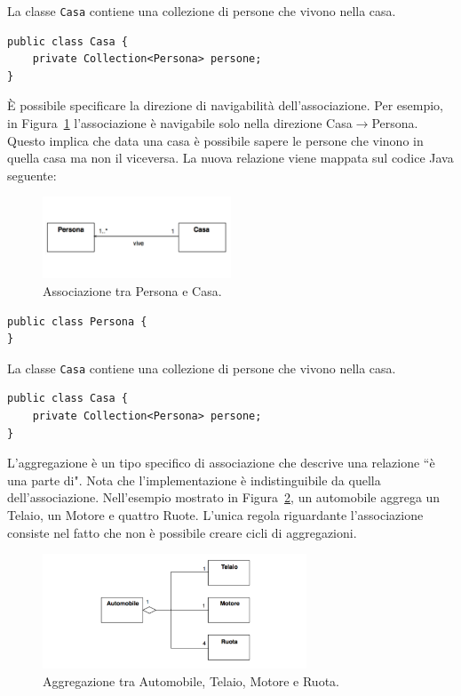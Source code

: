 \documentclass{article}
\begin{document}
La classe \texttt{Casa} contiene una collezione di persone che vivono nella casa.
\begin{lstlisting}
public class Casa {
    private Collection<Persona> persone; 
}
\end{lstlisting}
\`E possibile specificare la direzione di navigabilit\`a dell'associazione. 
Per esempio, in Figura~\ref{Fig:Associazione2} l'associazione \`e navigabile solo nella direzione Casa$\rightarrow$Persona. Questo implica che data una casa \`e possibile sapere le persone che vinono in quella casa ma non il viceversa. La nuova relazione viene mappata sul codice Java seguente:

\begin{figure}[h!]
  \centering
    \includegraphics[width=0.5\textwidth]{Img/Associazione2.pdf}
      \caption{Associazione tra Persona e Casa.}
      \label{Fig:Associazione2}
\end{figure}

\begin{lstlisting}
public class Persona {
}
\end{lstlisting}
La classe \texttt{Casa} contiene una collezione di persone che vivono nella casa.
\begin{lstlisting}
public class Casa {
    private Collection<Persona> persone; 
}
\end{lstlisting}

L'aggregazione \`e un tipo specifico di associazione che descrive una relazione ``\`e una parte di". Nota che l'implementazione \`e indistinguibile da quella dell'associazione. Nell'esempio mostrato in Figura~\ref{Fig:Aggregazione}, un automobile aggrega un Telaio, un Motore e quattro Ruote. L'unica regola riguardante l'associazione consiste nel fatto che non \`e possibile creare cicli di aggregazioni. 

\begin{figure}[h!]
  \centering
    \includegraphics[width=0.7\textwidth]{Img/Aggregazione.pdf}
      \caption{Aggregazione tra Automobile, Telaio, Motore e Ruota.}
      \label{Fig:Aggregazione}
\end{figure}
\end{document}
